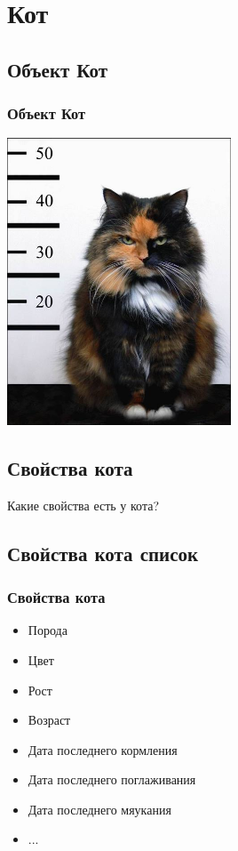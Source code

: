 \documentclass[compress,red]{beamer}
\begin{document}
\section{Кот}

\subsection{Объект Кот}
\begin{frame}
  \frametitle{Объект Кот}
	\centerline{\includegraphics[width=0.5\textwidth]{images/catE.jpg}}
\end{frame}

\subsection{Свойства кота}
\begin{frame}
  \begin{center}
    \Huge{Какие свойства есть у кота?}
  \end{center}
\end{frame}

\subsection{Свойства кота список}
\begin{frame}[fragile]
  \frametitle{Свойства кота}
  \begin{itemize}[<+->]
    \item Порода
    \item Цвет
    \item Рост
    \item Возраст
    \item Дата последнего кормления
    \item Дата последнего поглаживания
    \item Дата последнего мяукания
    \item ...
  \end{itemize}
\end{frame}
\end{document}
